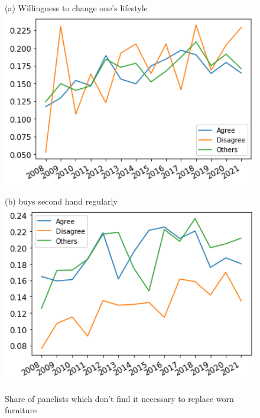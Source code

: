 \documentclass[12pt]{article}
\begin{document}
\begin{figure}[h!!]
	\centering	
	\caption{Share of panelists which don't find it necessary to replace worn furniture }\label{fig:evolution_notNecessary_bygroup:furniture}	
	\begin{minipage}[h!!]{0.32\textwidth}  
		\centering\footnotesize{(a) Willingness to change one's lifestyle}
		\includegraphics[width=1\textwidth]{../codding_data/results/liss/broad_groups_notnecessaryqk20a175_ci307.png}
	\end{minipage}
	\begin{minipage}[h!!]{0.32\textwidth}  
		\centering\footnotesize{(b) buys second hand regularly}
		\includegraphics[width=1\textwidth]{../codding_data/results/liss/broad_groups_notnecessaryqk20a135_ci307.png}
	\end{minipage}

\end{figure}
\end{document}
